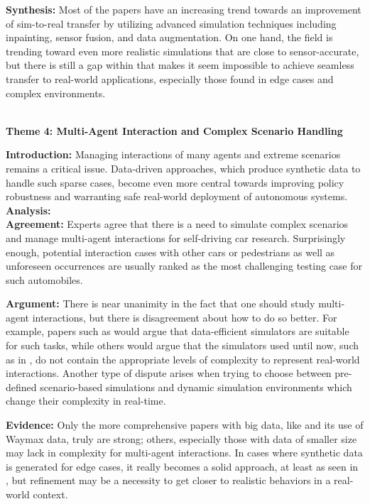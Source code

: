\documentclass[lettersize,journal]{IEEEtran}
\newcommand{\subsubsubsection}[1]{%
    \par\medskip
    \noindent\textbf{#1}
    \par\medskip
}
\begin{document}
\textbf{Synthesis:}
Most of the papers have an increasing trend towards an improvement of sim-to-real transfer by utilizing advanced simulation techniques including inpainting, sensor fusion, and data augmentation. On one hand, the field is trending toward even more realistic simulations that are close to sensor-accurate, but there is still a gap within that makes it seem impossible to achieve seamless transfer to real-world applications, especially those found in edge cases and complex environments.
\\
\\
\subsubsubsection{Theme 4: Multi-Agent Interaction and Complex Scenario Handling}
\textbf{Introduction:}
Managing interactions of many agents and extreme scenarios remains a critical issue. Data-driven approaches, which produce synthetic data to handle such sparse cases, become even more central towards improving policy robustness and warranting safe real-world deployment of autonomous systems.
\textbf{Analysis:}  \\
\textbf{Agreement:}
Experts agree that there is a need to simulate complex scenarios and manage multi-agent interactions for self-driving car research. Surprisingly enough, potential interaction cases with other cars or pedestrians as well as unforeseen occurrences are usually ranked as the most challenging testing case for such automobiles.

\textbf{Argument:}
There is near unanimity in the fact that one should study multi-agent interactions, but there is disagreement about how to do so better. For example, papers such as \cite{ref4} would argue that data-efficient simulators are suitable for such tasks, while others would argue that the simulators used until now, such as in \cite{ref9}, do not contain the appropriate levels of complexity to represent real-world interactions. Another type of dispute arises when trying to choose between pre-defined scenario-based simulations and dynamic simulation environments which change their complexity in real-time.


\textbf{Evidence:}
Only the more comprehensive papers with big data, like \cite{ref4} and its use of Waymax data, truly are strong; others, especially those with data of smaller size may lack in complexity for multi-agent interactions. In cases where synthetic data is generated for edge cases, it really becomes a solid approach, at least as seen in \cite{ref5}, but refinement may be a necessity to get closer to realistic behaviors in a real-world context.
\end{document}
